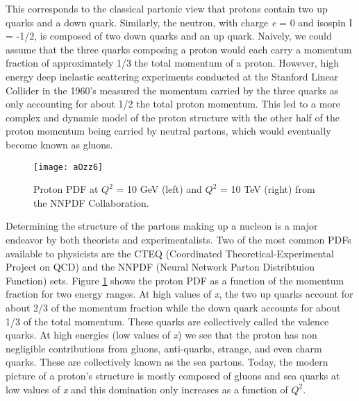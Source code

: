 \noindent
This corresponds to the classical partonic view that protons contain two up quarks and a down quark.  Similarly, the neutron, with charge \textit{e} = 0 and isospin I = -1/2, is composed of two down quarks and an up quark.  Naively, we could assume that the three quarks composing a proton would each carry a momentum fraction of approximately 1/3 the total momentum of a proton.  However, high energy deep inelastic scattering experiments conducted at the Stanford Linear Collider in the 1960's\cite{Panofsky:871460} measured the momentum carried by the three quarks as only accounting for about 1/2 the total proton momentum.  This led to a more complex and dynamic model of the proton structure with the other half of the proton momentum being carried by neutral partons, which would eventually become known as gluons.

\begin{figure}[b!]
\texttt{[image: aOzz6]}
\centering
\caption{Proton PDF at $Q^{2}$ = 10 GeV (left) and  $Q^{2}$ = 10 TeV (right) from the NNPDF Collaboration\cite{Feltesse:2010}.}
\label{fig:PDFNNPDF}
\end{figure}

Determining the structure of the partons making up a nucleon is a major endeavor by both theorists and experimentalists.  Two of the most common PDFs available to physicists are the CTEQ\cite{Kovarik:2013sya} (Coordinated Theoretical-Experimental Project on QCD) and the NNPDF\cite{Ball:1966481} (Neural Network Parton Distribtuion Function) sets.  Figure \ref{fig:PDFNNPDF} shows the proton PDF as a function of the momentum fraction for two energy ranges.  At high values of \textit{x}, the two up quarks account for about 2/3 of the momentum fraction while the down quark accounts for about 1/3 of the total momentum.  These quarks are collectively called the valence quarks.  At high energies (low values of \textit{x}) we see that the proton has non negligible contributions from gluons, anti-quarks, strange, and even charm quarks.  These are collectively known as the sea partons.  Today, the modern picture of a proton's structure is mostly composed of gluons and sea quarks at low values of \textit{x} and this domination only increases as a function of $Q^{2}$\cite{Fritzsch:1992mu}.

